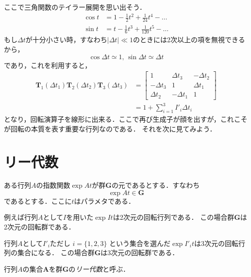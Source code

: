 \documentclass{jsbook}
\newcommand{\keyword}[1]{\emph{#1}}
\newcommand{\bop}[1]{\boldsymbol{#1}}
\newcommand{\bg}[1]{\mathbf{#1}}
\newcommand{\I}{I}%
\newcommand{\verysmall}{\varDelta}
\begin{document}
ここで三角関数のテイラー展開を思い出そう．
\begin{align}
\cos t&=1-\frac{1}{2}t^2+\frac{1}{24}t^4-\dots\\
\sin t&=t-\frac{1}{6}t^3+\frac{1}{120}t^5-\dots
\end{align}
もし$\verysmall t$が十分小さい時，すなわち$|\verysmall t|\ll1$のときには2次以上の項を無視できるから，
\begin{equation}
\cos\verysmall t\simeq1,\,
\sin\verysmall t\simeq\verysmall t
\end{equation}
であり，これを利用すると，
\begin{align}
\bop{T}_1(\verysmall t_1)\bop{T}_2(\verysmall t_2)\bop{T}_3(\verysmall t_3)
  &=\begin{bmatrix}1&\verysmall t_3&-\verysmall t_2\\
    -\verysmall t_3&1&\verysmall t_1\\
    \verysmall t_2&-\verysmall t_1&1\end{bmatrix}\\
  &=1+\sum_{i=1}^3I'_i\verysmall t_i
\end{align}
となり，回転演算子を線形に出来る．ここで再び生成子が顔を出すが，これこそが回転の本質を表す重要な行列なのである．
それを次に見てみよう．

\section{リー代数}

ある行列$A$の指数関数$\exp At$が群$\bg{G}$の元であるとする．すなわち
\begin{equation}
\exp At\in\bg{G}
\end{equation}
であるとする．ここに$t$はパラメタである．

例えば行列$A$として$I$を用いた$\exp It$は2次元の回転行列である．
この場合群$\bg{G}$は2次元の回転群である．

行列$A$として$\I'_i$ただし $i=\{1,2,3\}$ という集合を選んだ$\exp I'_it$は3次元の回転行列の集合になる．
この場合群$\bg{G}$は3次元の回転群である．

行列$A$の集合$\bg{A}$を群$\bg{G}$の\keyword{リー代数}と呼ぶ．
\end{document}
